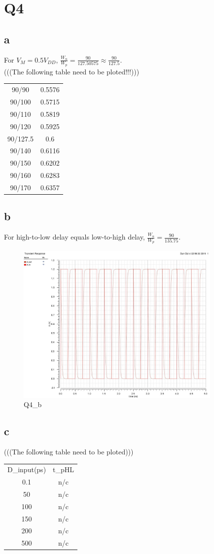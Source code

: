\documentclass[a4paper,10pt]{article}
\begin{document}
\section*{Q4}
\subsection*{a}
For \begin{math}V_{M} = 0.5V_{DD}\end{math}, \begin{math}\frac{W_n}{W_p} = \frac{90}{127.50575} \approx \frac{90}{127.5}\end{math}.\\
(((The following table need to be ploted!!!)))\\
\begin{tabular}{c|c}
 90/90	&	0.5576\\
 90/100	&	0.5715\\
 90/110	&	0.5819\\
 90/120	&	0.5925\\
 90/127.5	&	0.6\\
 90/140	&	0.6116\\
 90/150	&	0.6202\\
 90/160	&	0.6283\\
 90/170	&	0.6357\\
\end{tabular}
\subsection*{b}
For high-to-low delay equals low-to-high delay, \begin{math}\frac{W_n}{W_p} = \frac{90}{135.75}\end{math}.\\
\begin{figure}
 \centering
 \includegraphics[width=10cm]{Q4_b.jpg}
 \caption{Q4\_b}
\end{figure}

\subsection*{c}
(((The following table need to be ploted)))\\
\begin{tabular}{c c}
 D\_input(ps)	&	t\_pHL\\
 0.1		&	n/c\\
 50		&	n/c\\
 100		&	n/c\\
 150		&	n/c\\
 200		&	n/c\\
 500		&	n/c\\
\end{tabular}
\end{document}
